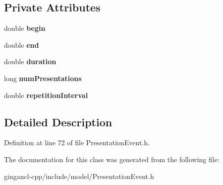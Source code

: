 \subsection*{Private Attributes}
\begin{CompactItemize}
\item 
double {\bf begin}\label{classbr_1_1pucrio_1_1telemidia_1_1ginga_1_1ncl_1_1model_1_1event_1_1PresentationEvent_d5a257d1d61c6ba22b332bfc93059304}

\item 
double {\bf end}\label{classbr_1_1pucrio_1_1telemidia_1_1ginga_1_1ncl_1_1model_1_1event_1_1PresentationEvent_2c6c1302fc577e5e226869e3b899043e}

\item 
double {\bf duration}\label{classbr_1_1pucrio_1_1telemidia_1_1ginga_1_1ncl_1_1model_1_1event_1_1PresentationEvent_b9f68ef753113e9b47b3363a00156209}

\item 
long {\bf numPresentations}\label{classbr_1_1pucrio_1_1telemidia_1_1ginga_1_1ncl_1_1model_1_1event_1_1PresentationEvent_1516fd6ab65dd5487f937e108340841d}

\item 
double {\bf repetitionInterval}\label{classbr_1_1pucrio_1_1telemidia_1_1ginga_1_1ncl_1_1model_1_1event_1_1PresentationEvent_fc3516338462c7cb1df417e2816e21b8}

\end{CompactItemize}


\subsection{Detailed Description}




Definition at line 72 of file PresentationEvent.h.

The documentation for this class was generated from the following file:\begin{CompactItemize}
\item 
gingancl-cpp/include/model/PresentationEvent.h\end{CompactItemize}
